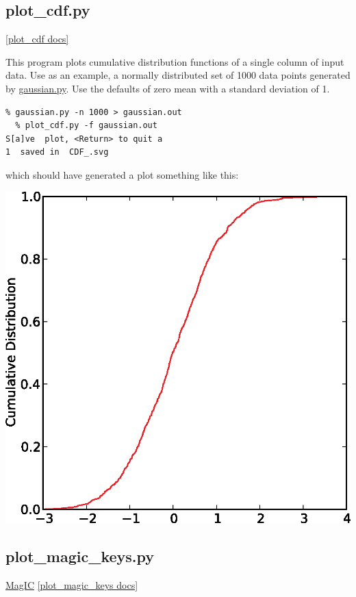 \documentclass[11pt]{book}
\begin{document}
{{{  
  \subsection{plot\_cdf.py}
  \href{http://earthref.org/PmagPy/pmagpydocs/plot_cdf-module.html}{[plot\_cdf docs]}
  
This program plots cumulative distribution functions of a single column of input data.  Use as an example, a normally distributed set of 1000 data points generated by \href{#gaussian.py}{gaussian.py}.  Use the defaults of zero mean with a standard deviation of 1.    

\begin{verbatim}
% gaussian.py -n 1000 > gaussian.out
  % plot_cdf.py -f gaussian.out 
S[a]ve  plot, <Return> to quit a
1  saved in  CDF_.svg
\end{verbatim}

which should have generated a plot something like this:


\includegraphics[width=12 cm]{EPSfiles/plot_cdf.eps}


%


  \subsection{plot\_magic\_keys.py}
  \href{#MagIC}{MagIC}
  \href{http://earthref.org/PmagPy/pmagpydocs/plot_magic_keys-module.html}{[plot\_magic\_keys docs]}
  
}}}
\end{document}
